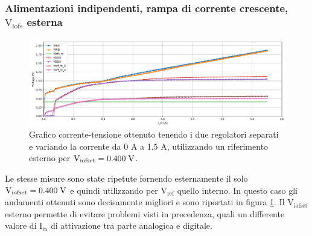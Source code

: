 \subsubsection{Alimentazioni indipendenti, rampa di corrente crescente, $\mathrm{V_{iofs}}$ esterna} 
\begin{figure}
\centering
\includegraphics[scale=.3]{Immagini/IUEViofs2}
\caption{Grafico corrente-tensione ottenuto tenendo i due regolatori separati e variando la corrente da 0 A a 1.5 A, utilizzando un riferimento esterno per $\mathrm{V_{iofset}}=0.400 \rm \; V$.}
\label{IUEViofs}
\end{figure}
Le stesse misure sono state ripetute fornendo esternamente il solo $\mathrm{V_{iofset}}=0.400 \rm \; V$ e quindi utilizzando per $\mathrm{V_{ref}}$ quello interno. In questo caso gli andamenti ottenuti sono decisamente migliori e sono riportati in figura \ref{IUEViofs}. 
Il $\mathrm{V_{iofset}}$ esterno permette di evitare problemi visti in precedenza, quali un differente valore di $\mathrm{I_{in}}$ di attivazione tra parte analogica e digitale.  
% 
%
%


